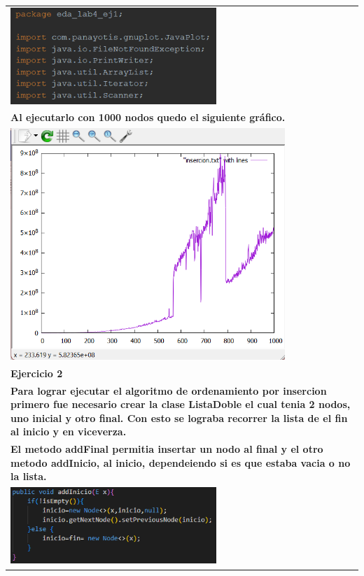 \documentclass[9pt]{article}
\begin{document}
\begin{longtable}{|p{15cm}|}
		\includegraphics[width=0.6\textwidth,keepaspectratio]{img/importar.png}\\
		\textbf{Al ejecutarlo con 1000 nodos quedo el siguiente gráfico.}\\
		\includegraphics[width=0.8\textwidth,keepaspectratio]{img/grafico.png}\\
		\textbf{Ejercicio 2}  \\
		\textbf{Para lograr ejecutar el algoritmo de ordenamiento por insercion 
			primero fue necesario crear la clase ListaDoble el cual tenia 2 nodos,
			uno inicial y otro final. Con esto se lograba recorrer la lista de el
			fin al inicio y en viceverza.}  \\
		\textbf{El metodo addFinal permitia insertar un nodo al final y el otro
			metodo addInicio, al inicio, dependeiendo si es que estaba vacia o no la lista.}  \\
		\includegraphics[width=0.6\textwidth,keepaspectratio]{img/addInicio.png}\\

\end{longtable}
\end{document}
